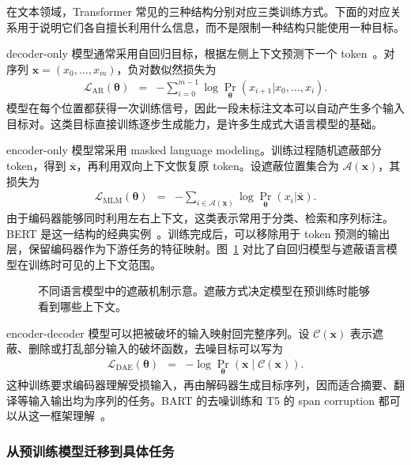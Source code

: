 在文本领域，Transformer 常见的三种结构分别对应三类训练方式。下面的对应关系用于说明它们各自擅长利用什么信息，而不是限制一种结构只能使用一种目标。

decoder-only 模型通常采用自回归目标，根据左侧上下文预测下一个 token~\cite{radford-etal:2018improving}。对序列 $\mathbf{x}=(x_0,\ldots,x_m)$，负对数似然损失为
\begin{eqnarray}
\mathcal{L}_{\mathrm{AR}}(\boldsymbol{\theta})
& = &
-
\sum_{i=0}^{m-1}
\log
\Pr_{\boldsymbol{\theta}}
(x_{i+1}|x_0,\ldots,x_i).
\end{eqnarray}
模型在每个位置都获得一次训练信号，因此一段未标注文本可以自动产生多个输入目标对。这类目标直接训练逐步生成能力，是许多生成式大语言模型的基础。

encoder-only 模型常采用 masked language modeling。训练过程随机遮蔽部分 token，得到 $\bar{\mathbf{x}}$，再利用双向上下文恢复原 token。设遮蔽位置集合为 $\mathcal{A}(\mathbf{x})$，其损失为
\begin{eqnarray}
\mathcal{L}_{\mathrm{MLM}}(\boldsymbol{\theta})
& = &
-
\sum_{i\in\mathcal{A}(\mathbf{x})}
\log
\Pr_{\boldsymbol{\theta}}(x_i|\bar{\mathbf{x}}).
\end{eqnarray}
由于编码器能够同时利用左右上下文，这类表示常用于分类、检索和序列标注。BERT 是这一结构的经典实例~\cite{DevlinEtAl2019BERT}。训练完成后，可以移除用于 token 预测的输出层，保留编码器作为下游任务的特征映射。图~\ref{fig:nlpbook-masking-language-models} 对比了自回归模型与遮蔽语言模型在训练时可见的上下文范围。

\begin{figure}[htbp]
  \centering
  
  \caption{不同语言模型中的遮蔽机制示意。遮蔽方式决定模型在预训练时能够看到哪些上下文。}
  \label{fig:nlpbook-masking-language-models}
\end{figure}

encoder-decoder 模型可以把被破坏的输入映射回完整序列。设 $\mathcal{C}(\mathbf{x})$ 表示遮蔽、删除或打乱部分输入的破坏函数，去噪目标可以写为
\begin{eqnarray}
\mathcal{L}_{\mathrm{DAE}}(\boldsymbol{\theta})
& = &
-\log
\Pr_{\boldsymbol{\theta}}
(\mathbf{x}\mid\mathcal{C}(\mathbf{x})).
\end{eqnarray}
这种训练要求编码器理解受损输入，再由解码器生成目标序列，因而适合摘要、翻译等输入输出均为序列的任务。BART 的去噪训练和 T5 的 span corruption 都可以从这一框架理解~\cite{LewisEtAl2020BART,RaffelEtAl2020T5}。

\subsubsection{从预训练模型迁移到具体任务}

